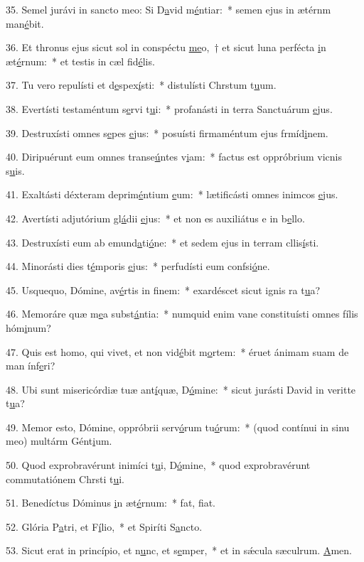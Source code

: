35. Semel jurávi in sancto meo: Si D\uline{a}vid m\uline{é}ntiar:~* semen ejus in ætérnm man\uline{é}bit.\par 
36. Et thronus ejus sicut sol in conspéctu \uline{me}o,~† et sicut luna perfécta \uline{i}n æt\uline{é}rnum:~* et testis in cæl fid\uline{é}lis.\par 
37. Tu vero repulísti et d\uline{e}spex\uline{í}sti:~* distulísti Chrstum t\uline{u}um.\par 
38. Evertísti testaméntum s\uline{e}rvi t\uline{u}i:~* profanásti in terra Sanctuárum \uline{e}jus.\par 
39. Destruxísti omnes s\uline{e}pes \uline{e}jus:~* posuísti firmaméntum ejus frmíd\uline{i}nem.\par 
40. Diripuérunt eum omnes transe\uline{ú}ntes v\uline{i}am:~* factus est oppróbrium vicnis s\uline{u}is.\par 
41. Exaltásti déxteram deprim\uline{é}ntium \uline{e}um:~* lætificásti omnes inimcos \uline{e}jus.\par 
42. Avertísti adjutórium gl\uline{á}dii \uline{e}jus:~* et non es auxiliátus e in b\uline{e}llo.\par 
43. Destruxísti eum ab emund\uline{a}ti\uline{ó}ne:~* et sedem ejus in terram cllis\uline{í}sti.\par 
44. Minorásti dies t\uline{é}mporis \uline{e}jus:~* perfudísti eum confsi\uline{ó}ne.\par 
45. Usquequo, Dómine, av\uline{é}rtis in f\uline{i}nem:~* exardéscet sicut ignis ra t\uline{u}a?\par 
46. Memoráre quæ m\uline{e}a subst\uline{á}ntia:~* numquid enim vane constituísti omnes fílis hóm\uline{i}num?\par 
47. Quis est homo, qui vivet, et non vid\uline{é}bit m\uline{o}rtem:~* éruet ánimam suam de man ínf\uline{e}ri?\par 
48. Ubi sunt misericórdiæ tuæ ant\uline{í}quæ, D\uline{ó}mine:~* sicut jurásti David in veritte t\uline{u}a?\par 
49. Memor esto, Dómine, oppróbrii serv\uline{ó}rum tu\uline{ó}rum:~* (quod contínui in sinu meo) multárm Gént\uline{i}um.\par 
50. Quod exprobravérunt inimíci t\uline{u}i, D\uline{ó}mine,~* quod exprobravérunt commutatiónem Chrsti t\uline{u}i.\par 
51. Benedíctus Dóminus \uline{i}n æt\uline{é}rnum:~* fat, f\uline{i}at.\par 
52. Glória P\uline{a}tri, et F\uline{í}lio,~* et Spiríti S\uline{a}ncto.\par 
53. Sicut erat in princípio, et n\uline{u}nc, et s\uline{e}mper,~* et in sǽcula sæculrum. \uline{A}men.\par 
